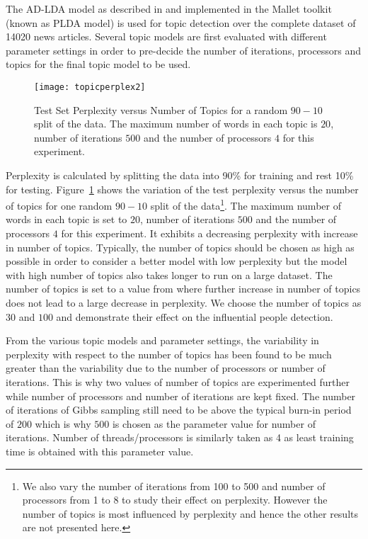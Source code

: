 The AD-LDA model as described in \cite{newman2009distributed} and implemented in the Mallet\cite{McCallumMALLET} toolkit (known as PLDA model) is used for topic detection over the complete dataset of 14020 news articles. 
Several topic models are first evaluated with different parameter settings in order to pre-decide the number of iterations, processors and topics for the final topic model to be used.



\begin{figure}[h]
\begin{center}
\texttt{[image: topicperplex2]}
\caption{Test Set Perplexity versus Number of Topics for a random $90-10$ split of the data. The maximum number of words in each topic is $20$, number of iterations $500$ and the number of processors $4$ for this experiment.}
\label{figure:perplex}
\end{center}
\end{figure}

Perplexity is calculated by splitting the data into 90\% for training and rest 10\% for testing. 
Figure~\ref{figure:perplex} shows the variation of the test perplexity versus the number of topics for one random $90-10$ split of the data\footnote{We also vary the number of iterations from 100 to 500 and number of processors from 1 to 8 to study their effect on perplexity. However the number of topics is most influenced by perplexity and hence the other results are not presented here.}. The maximum number of words in each topic is set to $20$, number of iterations $500$ and the number of processors $4$ for this experiment. It exhibits a decreasing perplexity with increase in number of topics. Typically, the number of topics should be chosen as high as possible in order to consider a better model with low perplexity but the model with high number of topics also takes longer to run on a large dataset. The number of topics is set to a value from where further increase in number of topics does not lead to a large decrease in perplexity. We choose the number of topics as $30$ and $100$ and demonstrate their effect on the influential people detection.

From the various topic models and parameter settings, the variability in perplexity with respect to the number of topics has been found to be much greater than the variability due to the number of processors or number of iterations. This is why two values of number of topics are experimented further while number of processors and number of iterations are kept fixed. The number of iterations of Gibbs sampling still need to be above the typical burn-in period of $200$ which is why $500$ is chosen as the parameter value for number of iterations. Number of threads/processors is similarly taken as 4 as least training time is obtained with this parameter value. 

